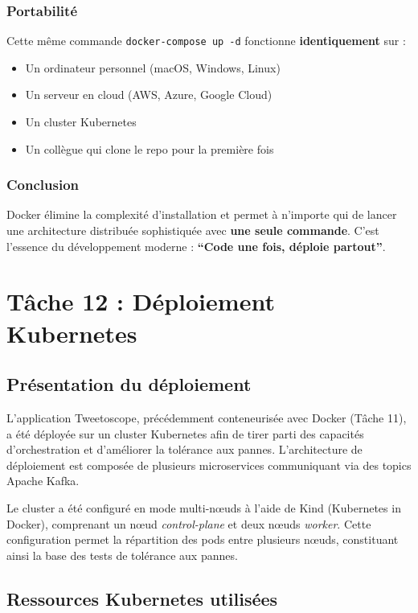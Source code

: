 \documentclass[10pt,a4paper]{article}
\begin{document}
\subsubsection{Portabilité}

Cette même commande \texttt{docker-compose up -d} fonctionne \textbf{identiquement} sur :
\begin{itemize}
    \item Un ordinateur personnel (macOS, Windows, Linux)
    \item Un serveur en cloud (AWS, Azure, Google Cloud)
    \item Un cluster Kubernetes
    \item Un collègue qui clone le repo pour la première fois
\end{itemize}

\subsubsection{Conclusion}

Docker élimine la complexité d'installation et permet à n'importe qui de lancer une architecture distribuée sophistiquée avec \textbf{une seule commande}. C'est l'essence du développement moderne : \textbf{``Code une fois, déploie partout''}.

\section{Tâche 12 : Déploiement Kubernetes}

\subsection{Présentation du déploiement}

L’application Tweetoscope, précédemment conteneurisée avec Docker (Tâche 11), a été déployée sur un cluster Kubernetes afin de tirer parti des capacités d’orchestration et d’améliorer la tolérance aux pannes. L’architecture de déploiement est composée de plusieurs microservices communiquant via des topics Apache Kafka.

Le cluster a été configuré en mode multi-nœuds à l’aide de Kind (Kubernetes in Docker), comprenant un nœud \textit{control-plane} et deux nœuds \textit{worker}. Cette configuration permet la répartition des pods entre plusieurs nœuds, constituant ainsi la base des tests de tolérance aux pannes.

\subsection{Ressources Kubernetes utilisées}
\end{document}
